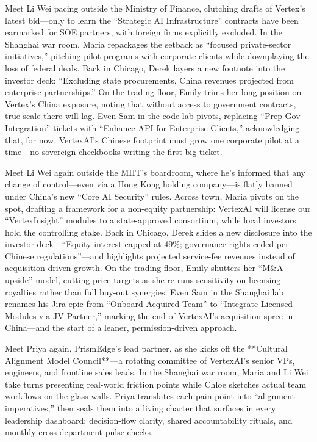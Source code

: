Meet Li Wei pacing outside the Ministry of Finance, clutching drafts of Vertex’s latest bid—only to learn the 
“Strategic AI Infrastructure” contracts have been earmarked for SOE partners, with foreign firms explicitly 
excluded. In the Shanghai war room, Maria repackages the setback as “focused private-sector initiatives,” pitching 
pilot programs with corporate clients while downplaying the loss of federal deals. Back in Chicago, Derek layers 
a new footnote into the investor deck: “Excluding state procurements, China revenues projected from enterprise 
partnerships.” On the trading floor, Emily trims her long position on Vertex’s China exposure, noting that without 
access to government contracts, true scale there will lag. Even Sam in the code lab pivots, replacing “Prep Gov 
Integration” tickets with “Enhance API for Enterprise Clients,” acknowledging that, for now, VertexAI’s Chinese 
footprint must grow one corporate pilot at a time—no sovereign checkbooks writing the first big ticket.

Meet Li Wei again outside the MIIT’s boardroom, where he’s informed that any change of control—even via a Hong 
Kong holding company—is flatly banned under China’s new “Core AI Security” rules. Across town, Maria pivots on 
the spot, drafting a framework for a non-equity partnership: VertexAI will license our “VertexInsight” modules 
to a state-approved consortium, while local investors hold the controlling stake. Back in Chicago, Derek slides 
a new disclosure into the investor deck—“Equity interest capped at 49\%; governance rights ceded per Chinese 
regulations”—and highlights projected service-fee revenues instead of acquisition-driven growth. On the trading 
floor, Emily shutters her “M\&A upside” model, cutting price targets as she re-runs sensitivity on licensing 
royalties rather than full buy-out synergies. Even Sam in the Shanghai lab renames his Jira epic from “Onboard 
Acquired Team” to “Integrate Licensed Modules via JV Partner,” marking the end of VertexAI’s acquisition spree 
in China—and the start of a leaner, permission-driven approach.

Meet Priya again, PrismEdge’s lead partner, as she kicks off the **Cultural Alignment Model Council**—a rotating 
committee of VertexAI’s senior VPs, engineers, and frontline sales leads. In the Shanghai war room, Maria and Li 
Wei take turns presenting real-world friction points while Chloe sketches actual team workflows on the glass walls. 
Priya translates each pain-point into “alignment imperatives,” then seals them into a living charter that surfaces 
in every leadership dashboard: decision-flow clarity, shared accountability rituals, and monthly cross-department 
pulse checks.

